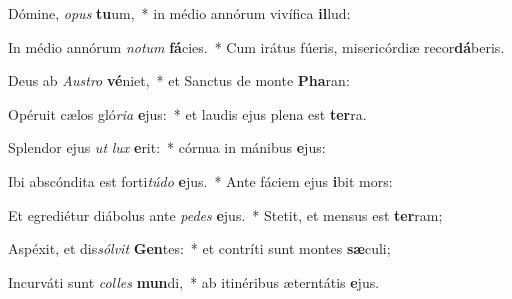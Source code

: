 \item Dómine, \textit{o}\textit{pus} \textbf{tu}um,~* in médio annórum vivífica \textbf{il}lud:
\item In médio annórum \textit{no}\textit{tum} \textbf{fá}cies.~* Cum irátus fúeris, misericórdiæ recor\textbf{dá}beris.
\item Deus ab \textit{Aus}\textit{tro} \textbf{vé}niet,~* et Sanctus de monte \textbf{Pha}ran:
\item Opéruit cælos gló\textit{ri}\textit{a} \textbf{e}jus:~* et laudis ejus plena est \textbf{ter}ra.
\item Splendor ejus \textit{ut} \textit{lux} \textbf{e}rit:~* córnua in mánibus \textbf{e}jus:
\item Ibi abscóndita est forti\textit{tú}\textit{do} \textbf{e}jus.~* Ante fáciem ejus \textbf{i}bit mors:
\item Et egrediétur diábolus ante \textit{pe}\textit{des} \textbf{e}jus.~* Stetit, et mensus est \textbf{ter}ram;
\item Aspéxit, et dis\textit{sól}\textit{vit} \textbf{Gen}tes:~* et contríti sunt montes \textbf{sæ}culi;
\item Incurváti sunt \textit{col}\textit{les} \textbf{mun}di,~* ab itinéribus æterntátis \textbf{e}jus.
